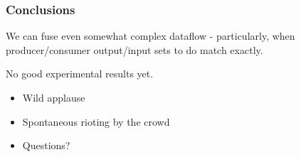 \documentclass{beamer}
\begin{document}
\begin{frame}[fragile,t]
  \frametitle{Conclusions}

  We can fuse even somewhat complex dataflow - particularly, when
  producer/consumer output/input sets to do match exactly.

  No good experimental results yet.

  \pause
  \begin{itemize}
    \item Wild applause
    \item Spontaneous rioting by the crowd
    \item Questions?
  \end{itemize}

\end{frame}
\end{document}
